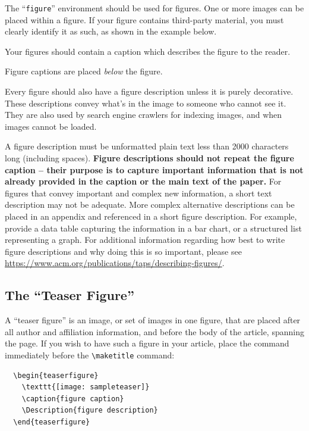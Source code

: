\documentclass[sigplan,screen]{acmart}
\begin{document}
The ``\verb|figure|'' environment should be used for figures. One or
more images can be placed within a figure. If your figure contains
third-party material, you must clearly identify it as such, as shown
in the example below.

Your figures should contain a caption which describes the figure to
the reader.

Figure captions are placed {\itshape below} the figure.

Every figure should also have a figure description unless it is purely
decorative. These descriptions convey what’s in the image to someone
who cannot see it. They are also used by search engine crawlers for
indexing images, and when images cannot be loaded.

A figure description must be unformatted plain text less than 2000
characters long (including spaces).  {\bfseries Figure descriptions
  should not repeat the figure caption – their purpose is to capture
  important information that is not already provided in the caption or
  the main text of the paper.} For figures that convey important and
complex new information, a short text description may not be
adequate. More complex alternative descriptions can be placed in an
appendix and referenced in a short figure description. For example,
provide a data table capturing the information in a bar chart, or a
structured list representing a graph.  For additional information
regarding how best to write figure descriptions and why doing this is
so important, please see
\url{https://www.acm.org/publications/taps/describing-figures/}.

\subsection{The ``Teaser Figure''}

A ``teaser figure'' is an image, or set of images in one figure, that
are placed after all author and affiliation information, and before
the body of the article, spanning the page. If you wish to have such a
figure in your article, place the command immediately before the
\verb|\maketitle| command:
\begin{verbatim}
  \begin{teaserfigure}
    \texttt{[image: sampleteaser]}
    \caption{figure caption}
    \Description{figure description}
  \end{teaserfigure}
\end{verbatim}
\end{document}
